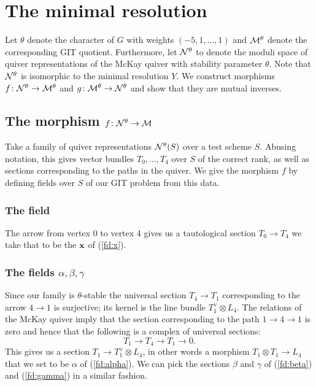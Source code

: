 \documentclass{amsart}
\theoremstyle{definition}
\begin{document}
\section{The minimal resolution}

Let $\theta$ denote the character of $G$ with weights $(-5,1,\ldots,1)$ and $\mathcal{M}^\theta$ denote the corresponding GIT quotient.
Furthermore, let $\mathcal{N}^\theta$ to denote the moduli space of quiver representations of the McKay quiver with stability parameter $\theta$.
Note that $\mathcal{N}^\theta$ is isomorphic to the minimal resolution $Y$.
We construct morphisms $f \colon \mathcal{N}^\theta \rightarrow \mathcal{M}^\theta$ and $g \colon \mathcal{M}^\theta \rightarrow \mathcal{N}^\theta$ and show that they are mutual inverses.

\subsection{The morphism $f \colon \mathcal{N}^\theta \rightarrow \mathcal{M}$}

Take a family of quiver representations $\mathcal{N}^\theta(S)$ over a test scheme $S$.
Abusing notation, this gives vector bundles $T_0, \ldots, T_4$ over $S$ of the correct rank, as well as sections corresponding to the paths in the quiver.
We give the morphism $f$ by defining fields over $S$ of our GIT problem from this data.

\subsubsection{The field \bfx}

The arrow from vertex $0$ to vertex $4$ gives us a tautological section $T_0 \rightarrow T_4$ we take that to be the $\mathbf{x}$ of (\ref{fd:x}).

\subsubsection{The fields $\alpha, \beta, \gamma$}

Since our family is $\theta$-stable the universal section $T_4 \rightarrow T_1$ corresponding to the arrow $4 \rightarrow 1$ is surjective; its kernel is the line bundle $T_1^\vee \otimes L_4$.
The relations of the McKay quiver imply that the section corresponding to the path $1 \rightarrow 4 \rightarrow 1$ is zero and hence that the following is a complex of universal sections:
$$T_1 \rightarrow T_4 \rightarrow T_1 \rightarrow 0.$$
This gives us a section $T_1 \rightarrow T_1^\vee \otimes L_4$, in other words a morphism $T_1 \otimes T_1 \rightarrow L_4$ that we set to be $\alpha$ of (\ref{fd:alpha}).
We can pick the sections $\beta$ and $\gamma$ of (\ref{fd:beta}) and (\ref{fd:gamma}) in a similar fashion.
\end{document}
